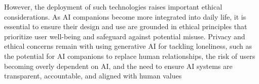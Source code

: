 However, the deployment of such technologies raises important ethical considerations. As AI companions become more integrated into daily life, it is essential to ensure their design and use are grounded in ethical principles that prioritize user well-being and safeguard against potential misuse. Privacy and ethical concerns remain with using generative AI for tackling loneliness, such as the potential for AI companions to replace human relationships, the risk of users becoming overly dependent on AI, and the need to ensure AI systems are transparent, accountable, and aligned with human values

